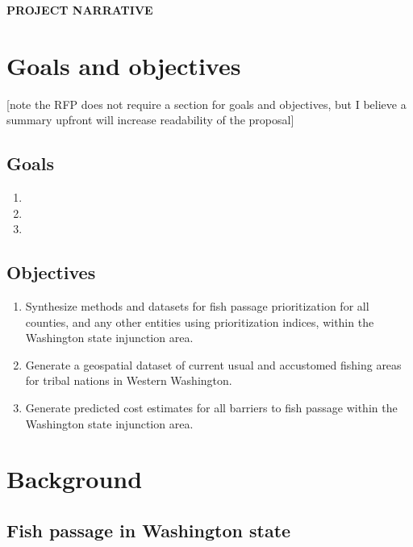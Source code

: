 \documentclass[12pt]{elsarticle}
\begin{document}
\begin{center} \textbf{PROJECT NARRATIVE} \end{center}

%
\section{Goals and objectives} [note the RFP does not require a section for goals and objectives, but I believe a summary upfront will increase readability of the proposal]
\subsection{Goals}
\begin{enumerate}
\item
\item
\item
\end{enumerate}

\subsection{Objectives}
\begin{enumerate}
\item Synthesize methods and datasets for fish passage prioritization for all counties, and any other entities using prioritization indices, within the Washington state injunction area.
\item Generate a geospatial dataset of current usual and accustomed fishing areas for tribal nations in Western Washington.
\item Generate predicted cost estimates for all barriers to fish passage within the Washington state injunction area. 
\end{enumerate}

\clearpage
%
\section{Background}
\subsection{Fish passage in Washington state}
\end{document}
